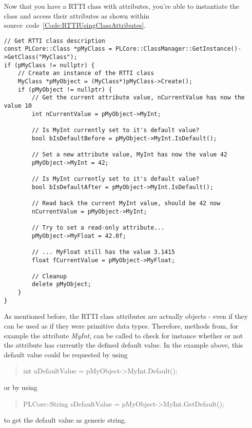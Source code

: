 Now that you have a RTTI class with attributes, you're able to instantiate the class and access their attributes as shown within source~code~\ref{Code:RTTIUsingClassAttributes}.
\begin{lstlisting}[label=Code:RTTIUsingClassAttributes,caption={Using RTTI class attributes}]
// Get RTTI class description
const PLCore::Class *pMyClass = PLCore::ClassManager::GetInstance()->GetClass("MyClass");
if (pMyClass != nullptr) {
	// Create an instance of the RTTI class
	MyClass *pMyObject = (MyClass*)pMyClass->Create();
	if (pMyObject != nullptr) {
		// Get the current attribute value, nCurrentValue has now the value 10
		int nCurrentValue = pMyObject->MyInt;

		// Is MyInt currently set to it's default value?
		bool bIsDefaultBefore = pMyObject->MyInt.IsDefault();

		// Set a new attribute value, MyInt has now the value 42
		pMyObject->MyInt = 42;

		// Is MyInt currently set to it's default value?
		bool bIsDefaultAfter = pMyObject->MyInt.IsDefault();

		// Read back the current MyInt value, should be 42 now
		nCurrentValue = pMyObject->MyInt;

		// Try to set a read-only attribute...
		pMyObject->MyFloat = 42.0f;

		// ... MyFloat still has the value 3.1415
		float fCurrentValue = pMyObject->MyFloat;

		// Cleanup
		delete pMyObject;
	}
}
\end{lstlisting}
As mentioned before, the RTTI class attributes are actually objects - even if they can be used as if they were primitive data types. Therefore, methods from, for example the attribute \emph{MyInt}, can be called to check for instance whether or not the attribute has currently the defined default value. In the example above, this default value could be requested by using \begin{quote}int nDefaultValue = pMyObject->MyInt.Default();\end{quote} or by using \begin{quote}PLCore::String sDefaultValue = pMyObject->MyInt.GetDefault();\end{quote} to get the default value as generic string.

